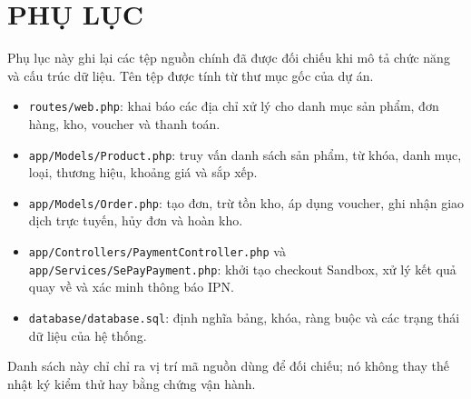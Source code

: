 \chapter*{PHỤ LỤC}\label{phuluc_intro}
\vspace{-40pt}
Phụ lục này ghi lại các tệp nguồn chính đã được đối chiếu khi mô tả chức năng và cấu trúc dữ liệu. Tên tệp được tính từ thư mục gốc của dự án.

\begin{itemize}
    \sloppy
    \raggedright
    \item \texttt{routes/web.php}: khai báo các địa chỉ xử lý cho danh mục sản phẩm, đơn hàng, kho, voucher và thanh toán.
    \item \texttt{app/Models/Product.php}: truy vấn danh sách sản phẩm, từ khóa, danh mục, loại, thương hiệu, khoảng giá và sắp xếp.
    \item \texttt{app/Models/Order.php}: tạo đơn, trừ tồn kho, áp dụng voucher, ghi nhận giao dịch trực tuyến, hủy đơn và hoàn kho.
    \item \texttt{app/Controllers/PaymentController.php} và \texttt{app/Services/SePayPayment.php}: khởi tạo checkout Sandbox, xử lý kết quả quay về và xác minh thông báo IPN.
    \item \texttt{database/database.sql}: định nghĩa bảng, khóa, ràng buộc và các trạng thái dữ liệu của hệ thống.
\end{itemize}

Danh sách này chỉ chỉ ra vị trí mã nguồn dùng để đối chiếu; nó không thay thế nhật ký kiểm thử hay bằng chứng vận hành.

